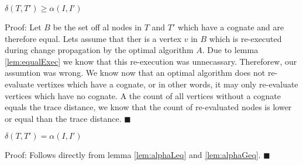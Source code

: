 \begin{lemma}
\label{lem:alphaGeq}
$\delta(T, T') \geq \alpha(I, I')$
\end{lemma} 
Proof: Let $B$ be the set off al nodes in $T$ and $T'$ which have a cognate and are therefore equal. Lets assume that ther is a vertex $v$ in $B$ which is re-executed during change propagation by the optimal algorithm $A$. Due to lemma \ref{lem:equalExec} we know that this re-execution was unnecassary. Thereforew, our assumtion was wrong. We know now that an optimal algorithm does not re-evaluate vertixes which have a cognate, or in other words, it may only re-evaluate vertices which have no cognate. A the count of all vertices without a cognate equals the trace distance, we know that the count of re-evaluated nodes is lower or equal than the trace distance. $\blacksquare$

\begin{theorem}
$\delta(T, T') = \alpha(I, I')$
\end{theorem}
Proof: Follows directly from lemma \ref{lem:alphaLeq} and \ref{lem:alphaGeq}. $\blacksquare$